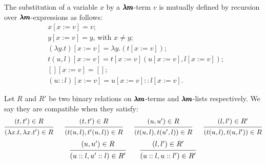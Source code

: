 \begin{definition}
  The substitution of a variable $x$ by a $\pmb{\lambda m}$-term $v$ is mutually defined by recursion over $\pmb{\lambda m}$-expressions as follows:  
  \begin{align*}
  & x[x := v] = v ; \\
  & y[x := v] = y \text{, with } x \neq y ; \\
  & (\lambda y . t)[x := v] = \lambda y . (t[x := v]) ; \\
  & t(u, l)[x := v] = t[x := v](u[x := v], l[x := v]) ; \\    
  & [][x := v] = [] ; \\
  & (u::l)[x := v] = u[x := v] :: l[x := v] .
  \end{align*}
\end{definition}

\begin{definition}
  \label{compatible_relation}
  Let $R$ and $R'$ be two binary relations on $\pmb{\lambda m}$-terms and $\pmb{\lambda m}$-lists respectively.
  We say they are compatible when they satisfy:
  \[
    \begin{prooftree}
      \hypo{ (t, t') \in R }
      \infer1{ (\lambda x . t, \lambda x . t') \in R } 
    \end{prooftree}
    \quad \ \
    \begin{prooftree}
      \hypo{ (t, t') \in R }
      \infer1{ (t(u, l), t'(u, l)) \in R } 
    \end{prooftree}
    \quad \ \
    \begin{prooftree}
      \hypo{ (u, u') \in R }
      \infer1{ (t(u, l), t(u', l)) \in R } 
    \end{prooftree}
    \quad \ \
    \begin{prooftree}
      \hypo{ (l, l') \in R' }
      \infer1{ (t(u, l), t(u, l')) \in R } 
    \end{prooftree}
  \]
  \[
    \begin{prooftree}
      \hypo{ (u, u') \in R }
      \infer1{ (u::l, u'::l) \in R' } 
    \end{prooftree}
    \qquad
    \begin{prooftree}
      \hypo{ (l, l') \in R' }
      \infer1{ (u::l, u::l') \in R' } 
    \end{prooftree}
  \]
\end{definition}

